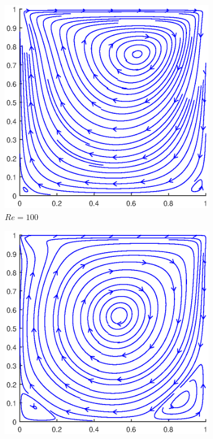 \begin{figure}[h]
	\centering
	\begin{subfigure}{0.5\textwidth}
		\includegraphics[scale=0.61]{DrivenCavity/100}
		\caption{$Re=100$}
	\end{subfigure}%
	\begin{subfigure}{0.5\textwidth}
		\includegraphics[scale=0.61]{DrivenCavity/1000}

\end{subfigure}
\end{figure}
